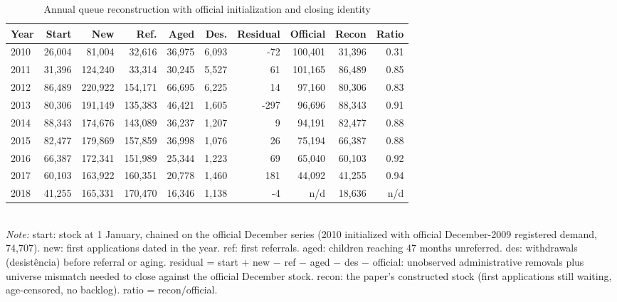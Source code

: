 \begin{table}[htbp]\centering
\caption{Annual queue reconstruction with official initialization and closing identity}
\label{tab:C5}
\footnotesize
\setlength{\tabcolsep}{4pt}
\begin{tabular}{lrrrrrrrrr}
\toprule
Year & Start & New & Ref. & Aged & Des. & Residual & Official & Recon & Ratio \\
\midrule
2010 & 26,004 & 81,004 & 32,616 & 36,975 & 6,093 & -72 & 100,401 & 31,396 & 0.31 \\
2011 & 31,396 & 124,240 & 33,314 & 30,245 & 5,527 & 61 & 101,165 & 86,489 & 0.85 \\
2012 & 86,489 & 220,922 & 154,171 & 66,695 & 6,225 & 14 & 97,160 & 80,306 & 0.83 \\
2013 & 80,306 & 191,149 & 135,383 & 46,421 & 1,605 & -297 & 96,696 & 88,343 & 0.91 \\
2014 & 88,343 & 174,676 & 143,089 & 36,237 & 1,207 & 9 & 94,191 & 82,477 & 0.88 \\
2015 & 82,477 & 179,869 & 157,859 & 36,998 & 1,076 & 26 & 75,194 & 66,387 & 0.88 \\
2016 & 66,387 & 172,341 & 151,989 & 25,344 & 1,223 & 69 & 65,040 & 60,103 & 0.92 \\
2017 & 60,103 & 163,922 & 160,351 & 20,778 & 1,460 & 181 & 44,092 & 41,255 & 0.94 \\
2018 & 41,255 & 165,331 & 170,470 & 16,346 & 1,138 & -4 & n/d & 18,636 & n/d \\
\bottomrule
\end{tabular}
\\[3pt]{\footnotesize \textit{Note:} start: stock at 1 January, chained on the official December series (2010 initialized with official December-2009 registered demand, 74{,}707). new: first applications dated in the year. ref: first referrals. aged: children reaching 47 months unreferred. des: withdrawals (desist\^encia) before referral or aging. residual = start + new $-$ ref $-$ aged $-$ des $-$ official: unobserved administrative removals plus universe mismatch needed to close against the official December stock. recon: the paper's constructed stock (first applications still waiting, age-censored, no backlog). ratio = recon$/$official.}
\end{table}
